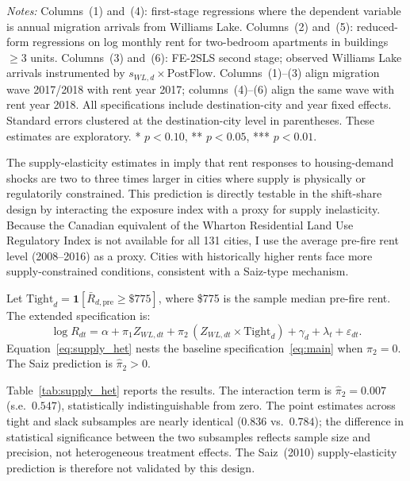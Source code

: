 \documentclass[12pt]{article}
\begin{document}
\begin{table}[!htbp]
\begin{minipage}{0.96\textwidth}
   \footnotesize
   \textit{Notes:} Columns~(1) and~(4): first-stage regressions where the
   dependent variable is annual migration arrivals from Williams Lake.
   Columns~(2) and~(5): reduced-form regressions on log monthly rent
   for two-bedroom apartments in buildings $\geq 3$ units. Columns~(3)
   and~(6): FE-2SLS second stage; observed Williams Lake arrivals
   instrumented by $s_{WL,d} \times \mathrm{PostFlow}$. Columns~(1)--(3)
   align migration wave 2017/2018 with rent year 2017; columns~(4)--(6)
   align the same wave with rent year 2018. All specifications include
   destination-city and year fixed effects. Standard errors clustered at the
   destination-city level in parentheses. These estimates are exploratory.
   * $p < 0.10$, ** $p < 0.05$, *** $p < 0.01$.
   \end{minipage}
\end{table}

The supply-elasticity estimates in \citet{saiz2010} imply that rent responses to housing-demand shocks are two to
three times larger in cities where supply is physically or regulatorily
constrained. This prediction is directly testable in the shift-share design by
interacting the exposure index with a proxy for supply inelasticity. Because the
Canadian equivalent of the Wharton Residential Land Use Regulatory Index is not
available for all 131 cities, I use the average pre-fire rent level (2008--2016)
as a proxy. Cities with historically higher rents face more supply-constrained
conditions, consistent with a Saiz-type mechanism.

Let $\mathrm{Tight}_d = \mathbf{1}[\bar{R}_{d,\text{pre}} \geq \$775]$, where
\$775 is the sample median pre-fire rent. The extended specification is:
\begin{equation}
\log R_{dt} = \alpha + \pi_1 Z_{WL,dt} + \pi_2\,(Z_{WL,dt}\times\mathrm{Tight}_d)
              + \gamma_d + \lambda_t + \varepsilon_{dt}.
\label{eq:supply_het}
\end{equation}
Equation~\eqref{eq:supply_het} nests the baseline specification~\eqref{eq:main} when $\pi_2=0$. The Saiz prediction is $\hat{\pi}_2 > 0$.

Table~\ref{tab:supply_het} reports the results. The interaction term is
$\hat{\pi}_2 = 0.007$ (s.e.\ $0.547$), statistically indistinguishable from
zero. The point estimates across tight and slack subsamples are nearly
identical ($0.836$ vs.\ $0.784$); the difference in statistical significance
between the two subsamples reflects sample size and precision, not heterogeneous
treatment effects. The Saiz~(2010) supply-elasticity prediction is therefore
not validated by this design.
\end{document}

